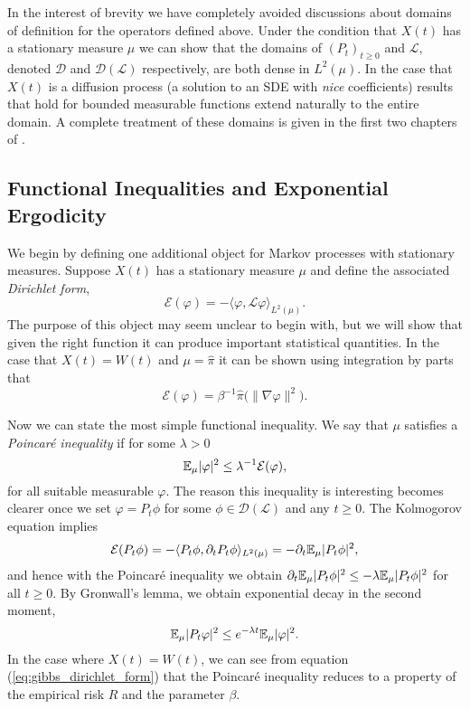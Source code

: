 \documentclass{article}
\newcommand{\Bcal}[1]{\mathcal{#1}}
\begin{document}
\begin{appendices}
In the interest of brevity we have completely avoided discussions about domains of definition for the operators defined above. Under the condition that \(X(t)\) has a stationary measure \(\mu\) we can show that the domains of \((P_t)_{t \geq 0}\) and \(\Bcal{L}\), denoted \(\Bcal{D}\) and \(\Bcal{D}(\Bcal{L})\) respectively, are both dense in \(L^2(\mu)\). In the case that \(X(t)\) is a diffusion process (a solution to an SDE with \textit{nice} coefficients) results that hold for bounded measurable functions extend naturally to the entire domain. A complete treatment of these domains is given in the first two chapters of \cite{Bakry2014AnalysisOperators}.

\subsection{Functional Inequalities and Exponential Ergodicity}
We begin by defining one additional object for Markov processes with stationary measures. Suppose \(X(t)\) has a stationary measure \(\mu\) and define the associated \textit{Dirichlet form},
\begin{equation*}
    \Bcal{E}(\varphi) = - \langle \varphi, \Bcal{L} \varphi \rangle_{L^2(\mu)}.
\end{equation*}
The purpose of this object may seem unclear to begin with, but we will show that given the right function it can produce important statistical quantities. In the case that \(X(t) = W(t)\) and \(\mu = \hat{\pi}\) it can be shown using integration by parts that
\begin{equation}\label{eq:gibbs_dirichlet_form}
    \Bcal{E}(\varphi) = \beta^{-1} \hat{\pi} \big (\|\nabla \varphi \|^2 \big ).
\end{equation}

Now we can state the most simple functional inequality. We say that \(\mu\) satisfies a \textit{Poincar\'{e} inequality} if for some \(\lambda > 0\)
\begin{equation*}
    \Bbb{E}_{\mu}|\varphi|^2 \leq \lambda^{-1} \Bcal{E}(\varphi),
\end{equation*}
for all suitable measurable \(\varphi\). The reason this inequality is interesting becomes clearer once we set \(\varphi = P_t \phi\) for some \(\phi \in \Bcal{D}(\Bcal{L})\) and any \(t \geq 0\). The Kolmogorov equation implies
\begin{equation*}
    \Bcal{E}(P_t\phi) = - \langle P_t\phi, \partial_t P_t\phi \rangle_{L^2(\mu)} = - \partial_t \Bbb{E}_{\mu} |P_t \phi|^2,
\end{equation*}
and hence with the Poincar\'{e} inequality we obtain \(\partial_t \Bbb{E}_{\mu} |P_t \phi|^2 \leq - \lambda \Bbb{E}_{\mu} |P_t \phi|^2\) for all \(t \geq 0\). By Gronwall's lemma, we obtain exponential decay in the second moment,
\begin{equation*}
    \Bbb{E}_{\mu} |P_t \varphi|^2 \leq e^{-\lambda t} \Bbb{E}_{\mu} |\varphi|^2.
\end{equation*}
In the case where \(X(t) = W(t)\), we can see from equation (\ref{eq:gibbs_dirichlet_form}) that the Poincar\'{e} inequality reduces to a property of the empirical risk \(R\) and the parameter \(\beta\).


\end{appendices}
\end{document}
